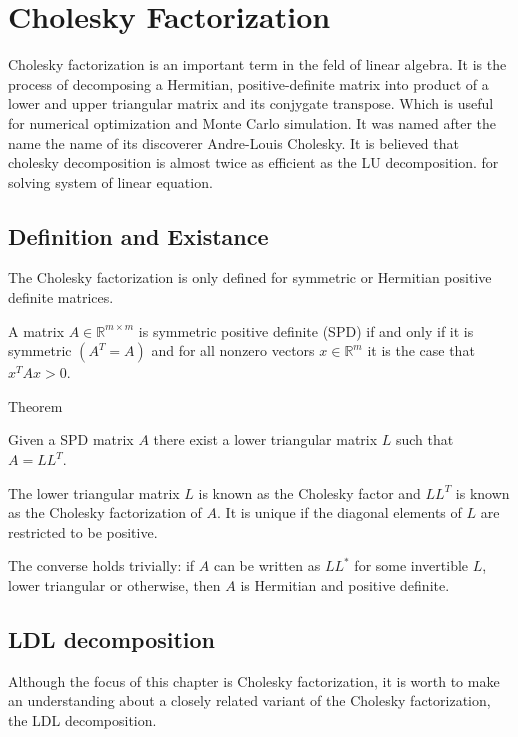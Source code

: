 
\chapter{Cholesky Factorization} %

\label{ChapterX} %

Cholesky factorization is an important term in the feld of linear algebra. It is the process of decomposing a Hermitian, positive-definite matrix into product of a lower and upper triangular matrix and its conjygate transpose. Which is useful for numerical optimization and Monte Carlo simulation. It was named after the name the name of its discoverer Andre-Louis Cholesky. It is believed that cholesky decomposition is almost twice as efficient as the LU decomposition. for solving system of linear equation.

\section{Definition and Existance}
The Cholesky factorization is only defined for symmetric or Hermitian positive definite matrices.
\begin{definition}
A matrix $A\in \mathbb{R}^{m\times m}$ is symmetric positive definite (SPD) if and only if it is symmetric $(A^T=A)$ and for all nonzero vectors $x\in \mathbb{R}^m$ it is the case that $x^TAx>0$.	
\end{definition}

\begin{mybox}{Theorem}
\begin{theorem}
	Given a SPD matrix $A$ there exist a lower triangular matrix $L$ such that $A=LL^T$.
\end{theorem}
\end{mybox}
The lower triangular matrix $L$ is known as the Cholesky factor and $LL^T$ is known as the Cholesky factorization of $A$. It is unique if the diagonal elements of $L$ are restricted to be positive.

The converse holds trivially: if $A$ can be written as $LL^*$ for some invertible $L$, lower triangular or otherwise, then $A$ is Hermitian and positive definite.
\section{LDL decomposition}
Although the focus of this chapter is Cholesky factorization, it is worth to make an understanding about a closely related variant of the Cholesky factorization, the LDL decomposition.

